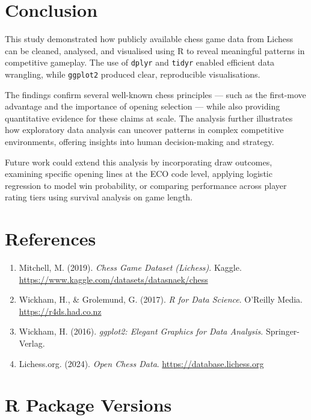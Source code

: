 \documentclass[12pt,a4paper]{article}
\begin{document}
\section{Conclusion}

This study demonstrated how publicly available chess game data from Lichess can be cleaned, analysed, and visualised using R to reveal meaningful patterns in competitive gameplay. The use of \texttt{dplyr} and \texttt{tidyr} enabled efficient data wrangling, while \texttt{ggplot2} produced clear, reproducible visualisations.

The findings confirm several well-known chess principles --- such as the first-move advantage and the importance of opening selection --- while also providing quantitative evidence for these claims at scale. The analysis further illustrates how exploratory data analysis can uncover patterns in complex competitive environments, offering insights into human decision-making and strategy.

Future work could extend this analysis by incorporating draw outcomes, examining specific opening lines at the ECO code level, applying logistic regression to model win probability, or comparing performance across player rating tiers using survival analysis on game length.

\section*{References}

\begin{enumerate}
    \item Mitchell, M. (2019). \textit{Chess Game Dataset (Lichess)}. Kaggle. \url{https://www.kaggle.com/datasets/datasnaek/chess}
    \item Wickham, H., \& Grolemund, G. (2017). \textit{R for Data Science}. O'Reilly Media. \url{https://r4ds.had.co.nz}
    \item Wickham, H. (2016). \textit{ggplot2: Elegant Graphics for Data Analysis}. Springer-Verlag.
    \item Lichess.org. (2024). \textit{Open Chess Data}. \url{https://database.lichess.org}
\end{enumerate}

\appendix
\section{R Package Versions}
\end{document}
